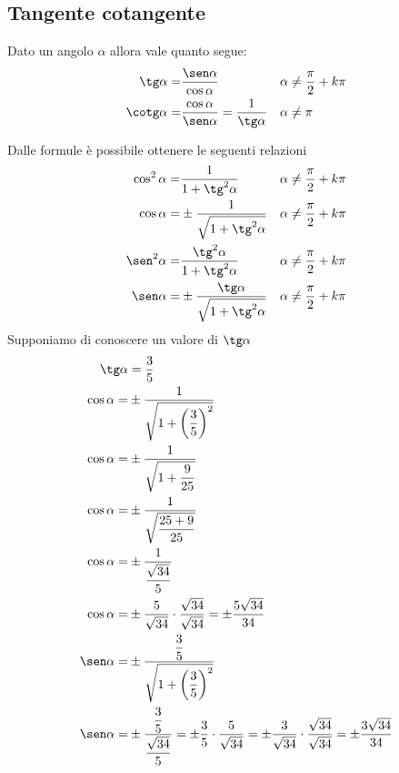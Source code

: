 \subsection{Tangente cotangente}
\label{sec:TangenteCotangente}
\begin{definizione}
	Dato un angolo $\alpha$ allora vale quanto segue:
\begin{align}
\tg\alpha=&{}\dfrac{\sen\alpha}{\cos\alpha}&\alpha&{}\neq\dfrac{\pi}{2}+k\pi\label{equ:tangente1}\\
\cotg\alpha=&{}\dfrac{\cos\alpha}{\sen\alpha}={}\dfrac{1}{\tg\alpha}& \alpha&{}\neq\pi\label{equ:cotangente1}
\end{align}
\end{definizione}
Dalle formule\nobs{} è possibile ottenere le seguenti relazioni
\begin{align*}
\cos^{2}\alpha=&{}\dfrac{1}{1+{\tg}^{2}\alpha} &\alpha&{}\neq\dfrac{\pi}{2}+k\pi\\
\cos\alpha=&{}\pm\dfrac{1}{\sqrt{1+{\tg}^{2}\alpha}} &\alpha{}&\neq\dfrac{\pi}{2}+k\pi\\
\sen^{2}\alpha=&{}\dfrac{\tg^{2}\alpha}{1+\tg^{2}\alpha}&\alpha{}&\neq\dfrac{\pi}{2}+k\pi\\
\sen\alpha=&{}\pm\dfrac{\tg\alpha}{\sqrt{1+\tg^{2}\alpha}}&\alpha{}&\neq\dfrac{\pi}{2}+k\pi
\end{align*}
Supponiamo di conoscere un valore di $\tg\alpha$
\begin{align*}
\tg\alpha&{}=\dfrac{3}{5}\\
\cos\alpha=&{}\pm\dfrac{1}{\sqrt{1+\left(\dfrac{3}{5}\right)^2}}\\
\cos\alpha=&{}\pm\dfrac{1}{\sqrt{1+\dfrac{9}{25}}}\\
\cos\alpha=&{}\pm\dfrac{1}{\sqrt{\dfrac{25+9}{25}}}\\
\cos\alpha=&{}\pm\dfrac{1}{\dfrac{\sqrt{34}}{5}}\\
\cos\alpha=&{}\pm\dfrac{5}{\sqrt{34}}\cdot\dfrac{\sqrt{34}}{\sqrt{34}}=\pm\dfrac{5\sqrt{34}}{34}\\
\sen\alpha=&{}\pm\dfrac{\dfrac{3}{5}}{\sqrt{1+\left(\dfrac{3}{5}\right)^2}}\\
\sen\alpha=&{}\pm\dfrac{\dfrac{3}{5}}{\dfrac{\sqrt{34}}{5}}=\pm\dfrac{3}{5}\cdot\dfrac{5}{\sqrt{34}}=\pm\dfrac{3}{\sqrt{34}}\cdot\dfrac{\sqrt{34}}{\sqrt{34}}=\pm\dfrac{3\sqrt{34}}{34}
\end{align*}
